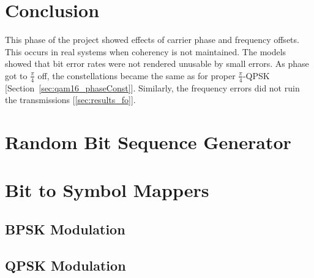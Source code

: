 \documentclass[]{article}
\begin{document}
\newpage
\section{Conclusion}
\label{sec:conc}
This phase of the project showed effects of carrier phase and frequency offsets.  This occurs in real systems when coherency is not maintained.  The models showed that bit error rates were not rendered unusable by small errors.  As phase got to $\frac{\pi}{4}$ off, the constellations became the same as for proper $\frac{\pi}{4}$-QPSK [Section~\ref{sec:qam16_phaseConst}].  Similarly, the frequency errors did not ruin the transmissions [\ref{sec:results_fo}].  

\appendix
\newpage


\newpage
%


\section{Random Bit Sequence Generator}
\label{app:random_bit_generator}


\section{Bit to Symbol Mappers}
\label{app:bittosym}
\subsection{BPSK Modulation }
\label{app:bpsk_mod}
%



\subsection{QPSK Modulation}
\label{app:qpsk_mod}

\end{document}
